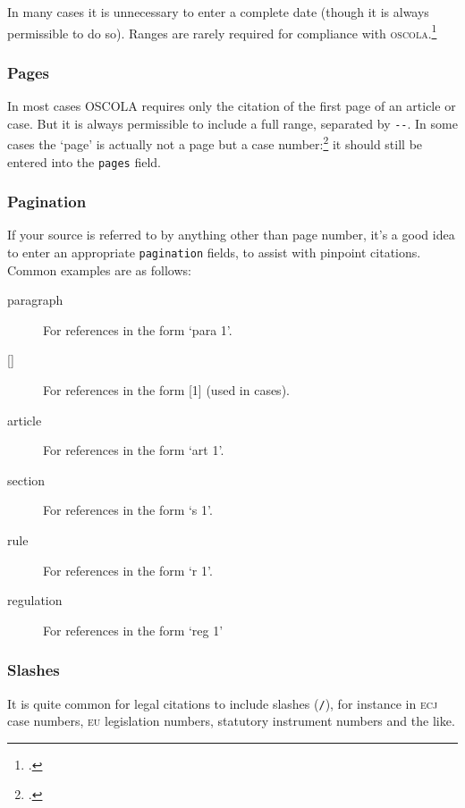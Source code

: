 \documentclass[a5paper,fontsize=9pt,DIV=1]{scrartcl}
\newcommand{\oscolashort}{\textsc{oscola}\nocite{oscola}}
\begin{document}
In many cases it is unnecessary to enter a complete date (though it is
always permissible to do so). Ranges are rarely required for
compliance with \oscolashort.\footcite[They are needed only when referring
to sessions of Parliament: see][40]{oscola}

\subsubsection{Pages}

In most cases OSCOLA requires only the citation of the first page of
an article or case. But it is always permissible to include a full
range, separated by \verb|--|. In some cases the `page' is actually
not a page but a case number:\footcite[See, eg,][18]{oscola} it should
still be entered into the \texttt{pages} field.

\subsubsection{Pagination\label{pagination}}

If your source is referred to by anything other than page number, it's a good idea to enter an appropriate \texttt{pagination} fields, to assist with pinpoint citations. Common examples are as follows:
\begin{description}
\item[paragraph] For references in the form `para 1'.
\item[{[]}] For references in the form [1] (used in cases).
\item[article] For references in the form `art 1'.
\item[section] For references in the form `s 1'.
\item[rule] For references in the form `r 1'.
\item[regulation] For references in the form `reg 1'
\end{description}

\subsubsection{Slashes}

It is quite common for legal citations to include slashes
(\texttt{/}), for instance in \textsc{ecj} case numbers, \textsc{eu}
legislation numbers, statutory instrument numbers and the like.
\end{document}
